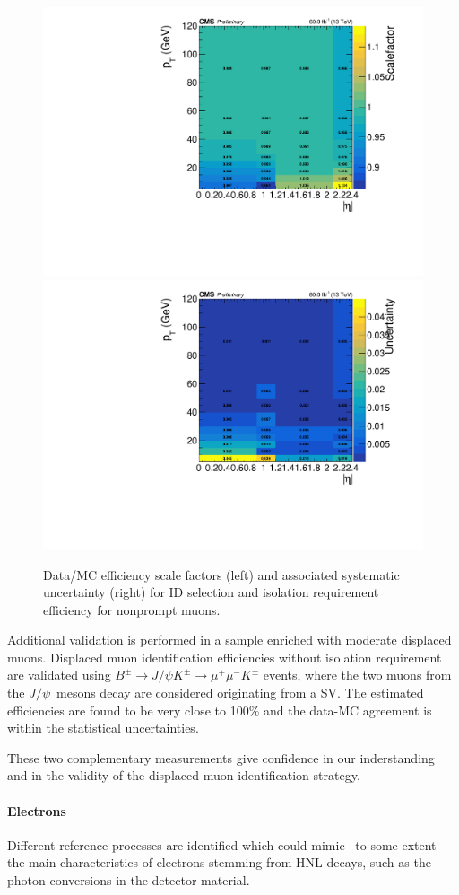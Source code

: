 \begin{figure}[h]
  \centering
 \includegraphics[width=.45\textwidth]{Figures/c6/efficiencies/muons/2018/idiso_nonprompt_sf_2018.pdf}
  \includegraphics[width=.45\textwidth]{Figures/c6/efficiencies/muons/2018/idiso_nonprompt_syst_2018.pdf}
  \caption{Data/MC efficiency scale factors (left) and associated
  systematic uncertainty (right) for ID selection and isolation
  requirement efficiency for nonprompt muons. \kirill}
  \label{fig:idiso_muon_nonprompt}
\end{figure}

Additional validation is performed in a sample enriched with moderate
displaced muons. Displaced muon identification efficiencies without
isolation requirement 
are validated using
$B^{\pm}\rightarrow J/\psi K^{\pm}\rightarrow \mu^{+} \mu^{-} K^{\pm}$ events, where the two muons
from the $ J/\psi$~mesons decay are considered originating from a SV. The
estimated efficiencies are found to be very close to 100\% and the data-MC
agreement is within the statistical
uncertainties.

These two complementary measurements give confidence in our inderstanding
and in the validity of the displaced muon identification strategy.

\paragraph{Electrons}\label{sec:eff_disp_ele}

Different reference processes are identified which could mimic --to
some extent-- the main characteristics of \displ electrons 
stemming from HNL decays, such as the photon conversions in the
detector material.

